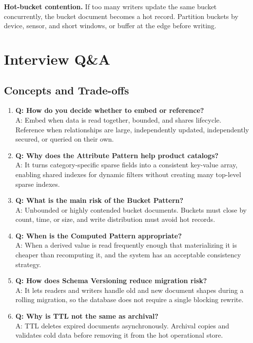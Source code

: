 \begin{pitfall}
\textbf{Hot-bucket contention.} If too many writers update the same bucket concurrently, the bucket document becomes a hot record. Partition buckets by device, sensor, and short windows, or buffer at the edge before writing.
\end{pitfall}

\section{Interview Q\&A}
\subsection{Concepts and Trade-offs}
\begin{enumerate}
    \item \textbf{Q: How do you decide whether to embed or reference?}\\
    A: Embed when data is read together, bounded, and shares lifecycle. Reference when relationships are large, independently updated, independently secured, or queried on their own.

    \item \textbf{Q: Why does the Attribute Pattern help product catalogs?}\\
    A: It turns category-specific sparse fields into a consistent key-value array, enabling shared indexes for dynamic filters without creating many top-level sparse indexes.

    \item \textbf{Q: What is the main risk of the Bucket Pattern?}\\
    A: Unbounded or highly contended bucket documents. Buckets must close by count, time, or size, and write distribution must avoid hot records.

    \item \textbf{Q: When is the Computed Pattern appropriate?}\\
    A: When a derived value is read frequently enough that materializing it is cheaper than recomputing it, and the system has an acceptable consistency strategy.

    \item \textbf{Q: How does Schema Versioning reduce migration risk?}\\
    A: It lets readers and writers handle old and new document shapes during a rolling migration, so the database does not require a single blocking rewrite.

    \item \textbf{Q: Why is TTL not the same as archival?}\\
    A: TTL deletes expired documents asynchronously. Archival copies and validates cold data before removing it from the hot operational store.
\end{enumerate}

